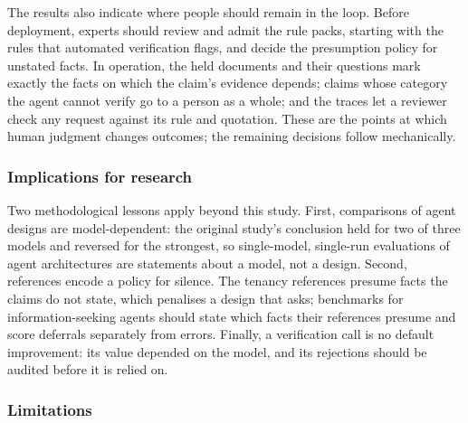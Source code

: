 The results also indicate where people should remain in the loop. Before deployment, experts should review and admit the rule packs, starting with the rules that automated verification flags, and decide the presumption policy for unstated facts. In operation, the held documents and their questions mark exactly the facts on which the claim's evidence depends; claims whose category the agent cannot verify go to a person as a whole; and the traces let a reviewer check any request against its rule and quotation. These are the points at which human judgment changes outcomes; the remaining decisions follow mechanically.

\subsubsection{Implications for research}
\label{app:s1-research}

Two methodological lessons apply beyond this study. First, comparisons of agent designs are model-dependent: the original study's conclusion held for two of three models and reversed for the strongest, so single-model, single-run evaluations of agent architectures are statements about a model, not a design. Second, references encode a policy for silence. The tenancy references presume facts the claims do not state, which penalises a design that asks; benchmarks for information-seeking agents should state which facts their references presume and score deferrals separately from errors. Finally, a verification call is no default improvement: its value depended on the model, and its rejections should be audited before it is relied on.

\subsubsection{Limitations}
\label{app:s1-limitations}

